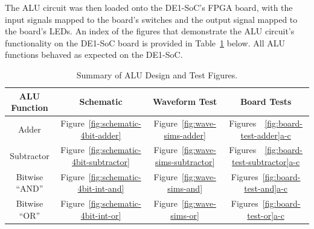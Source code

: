 \documentclass[11pt, letterpaper]{article} %
\begin{document}
The ALU circuit was then loaded onto the DE1-SoC's FPGA board, with the input signals mapped to the board's switches and the output signal mapped to the board's LEDs. An index of the figures that demonstrate the ALU circuit's functionality on the DE1-SoC board is provided in Table~\ref{tab:figure-summary} below. All ALU functions behaved as expected on the DE1-SoC.

\begin{table}[h]\centering
    \caption{Summary of ALU Design and Test Figures.}\label{tab:figure-summary}
    \def\arraystretch{1.3}
    \begin{tabular}{cccc}
        \hline
        \textbf{ALU Function} & \textbf{Schematic} & \textbf{Waveform Test} & \textbf{Board Tests}\\
        \hline
        Adder & Figure~\ref{fig:schematic-4bit-adder} &  Figure~\ref{fig:wave-sims-adder} & Figures~~\hyperref[fig:board-test-adder]{\ref{fig:board-test-adder}a-c}\\
        Subtractor & Figure~\ref{fig:schematic-4bit-subtractor} &  Figure~\ref{fig:wave-sims-subtractor} & Figures~~\hyperref[fig:board-test-subtractor]{\ref{fig:board-test-subtractor}a-c}\\
        Bitwise ``AND'' & Figure~\ref{fig:schematic-4bit-int-and} &  Figure~\ref{fig:wave-sims-and} & Figures~\hyperref[fig:board-test-and]{\ref{fig:board-test-and}a-c}\\
        Bitwise ``OR'' & Figure~\ref{fig:schematic-4bit-int-or} &  Figure~\ref{fig:wave-sims-or} & Figures~\hyperref[fig:board-test-or]{\ref{fig:board-test-or}a-c}\\
        \hline
    \end{tabular}
\end{table}
\end{document}
